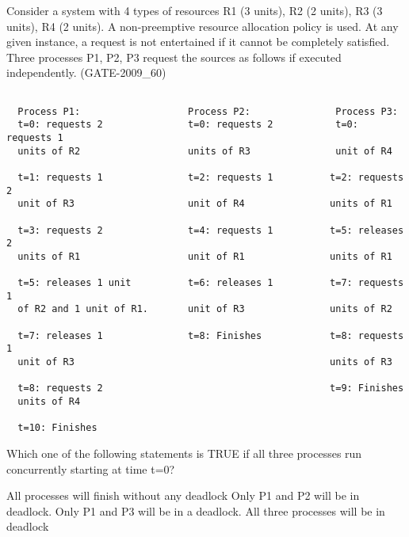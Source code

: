 \begin{questyle}

  \question  Consider a system with 4 types of resources R1 (3 units), R2 (2 units), R3 (3 units), R4 (2 units).
             A non-preemptive resource allocation policy is used. At any given instance, a request is not entertained
             if it cannot be completely satisfied. Three processes P1, P2, P3 request the sources as follows
             if executed independently. (GATE-2009\_60)

\begin{lstlisting}

  Process P1:                   Process P2:               Process P3:
  t=0: requests 2               t=0: requests 2           t=0: requests 1
  units of R2                   units of R3               unit of R4

  t=1: requests 1               t=2: requests 1          t=2: requests 2
  unit of R3                    unit of R4               units of R1

  t=3: requests 2               t=4: requests 1          t=5: releases 2
  units of R1                   unit of R1               units of R1

  t=5: releases 1 unit          t=6: releases 1          t=7: requests 1
  of R2 and 1 unit of R1.       unit of R3               units of R2

  t=7: releases 1               t=8: Finishes            t=8: requests 1
  unit of R3                                             units of R3

  t=8: requests 2                                        t=9: Finishes
  units of R4

  t=10: Finishes

\end{lstlisting}

             Which one of the following statements is TRUE if all three processes run concurrently starting at time t=0?
  \begin{choices}
    \correctchoice All processes will finish without any deadlock
    \choice Only P1 and P2 will be in deadlock.
    \choice Only P1 and P3 will be in a deadlock.
    \choice All three processes will be in deadlock
  \end{choices}

  \end{questyle}




